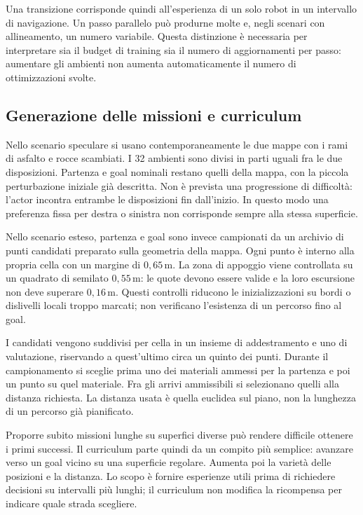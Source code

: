 Una transizione corrisponde quindi all'esperienza di un solo robot in un intervallo di navigazione. Un passo parallelo può produrne molte e, negli scenari con allineamento, un numero variabile. Questa distinzione è necessaria per interpretare sia il budget di training sia il numero di aggiornamenti per passo: aumentare gli ambienti non aumenta automaticamente il numero di ottimizzazioni svolte.

\subsection{Generazione delle missioni e curriculum}

Nello scenario speculare si usano contemporaneamente le due mappe con i rami di asfalto e rocce scambiati. I 32 ambienti sono divisi in parti uguali fra le due disposizioni. Partenza e goal nominali restano quelli della mappa, con la piccola perturbazione iniziale già descritta. Non è prevista una progressione di difficoltà: l'actor incontra entrambe le disposizioni fin dall'inizio. In questo modo una preferenza fissa per destra o sinistra non corrisponde sempre alla stessa superficie.

Nello scenario esteso, partenza e goal sono invece campionati da un archivio di punti candidati preparato sulla geometria della mappa. Ogni punto è interno alla propria cella con un margine di $0{,}65\,\mathrm{m}$. La zona di appoggio viene controllata su un quadrato di semilato $0{,}55\,\mathrm{m}$: le quote devono essere valide e la loro escursione non deve superare $0{,}16\,\mathrm{m}$. Questi controlli riducono le inizializzazioni su bordi o dislivelli locali troppo marcati; non verificano l'esistenza di un percorso fino al goal.

I candidati vengono suddivisi per cella in un insieme di addestramento e uno di valutazione, riservando a quest'ultimo circa un quinto dei punti. Durante il campionamento si sceglie prima uno dei materiali ammessi per la partenza e poi un punto su quel materiale. Fra gli arrivi ammissibili si selezionano quelli alla distanza richiesta. La distanza usata è quella euclidea sul piano, non la lunghezza di un percorso già pianificato.

Proporre subito missioni lunghe su superfici diverse può rendere difficile ottenere i primi successi. Il curriculum parte quindi da un compito più semplice: avanzare verso un goal vicino su una superficie regolare. Aumenta poi la varietà delle posizioni e la distanza. Lo scopo è fornire esperienze utili prima di richiedere decisioni su intervalli più lunghi; il curriculum non modifica la ricompensa per indicare quale strada scegliere.

